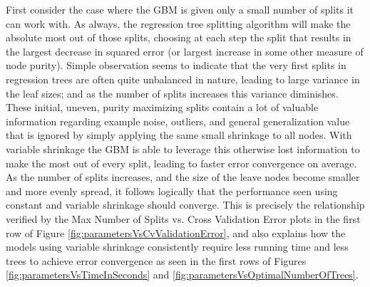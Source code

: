 \documentclass[9pt, conference]{IEEEtran}
\begin{document}
First consider the case where the GBM is given only a small number of splits it can work with. As always, the regression tree splitting algorithm will make the absolute most out of those splits, choosing at each step the split that results in the largest decrease in squared error (or largest increase in some other measure of node purity). Simple observation seems to indicate that the very first splits in regression trees are often quite unbalanced in nature, leading to large variance in the leaf sizes; and as the number of splits increases this variance diminishes. These initial, uneven, purity maximizing splits contain a lot of valuable information regarding example noise, outliers, and general generalization value that is ignored by simply applying the same small shrinkage to all nodes. With variable shrinkage the GBM is able to leverage this otherwise lost information to make the most out of every split, leading to faster error convergence on average. As the number of splits increases, and the size of the leave nodes become smaller and more evenly spread, it follows logically that the performance seen using constant and variable shrinkage should converge. This is precisely the relationship verified by the Max Number of Splits vs. Cross Validation Error plots in the first row of Figure \ref{fig:parametersVsCvValidationError}, and also explains how the models using variable shrinkage consistently require less running time and less trees to achieve error convergence as seen in the first rows of Figures \ref{fig:parametersVsTimeInSeconds} and \ref{fig:parametersVsOptimalNumberOfTrees}.
\end{document}
